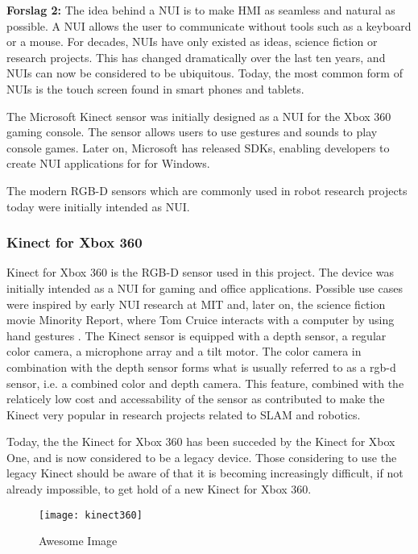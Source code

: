 \textbf{Forslag 2:}
The idea behind a \ac{NUI} is to make \ac{HMI} as seamless and natural as possible. A \ac{NUI} allows the user to communicate without tools such as a keyboard or a mouse. For decades, \ac{NUI}s have only existed as ideas, science fiction or research projects. This has changed dramatically over the last ten years, and \ac{NUI}s can now be considered to be ubiquitous. Today, the most common form of \ac{NUI}s is the touch screen found in smart phones and tablets. 

The Microsoft Kinect sensor was initially designed as a \ac{NUI} for the Xbox 360 gaming console. The sensor allows users to use gestures and sounds to play console games. Later on, Microsoft has released SDKs, enabling developers to create \ac{NUI} applications for for Windows. 

The modern RGB-D sensors which are commonly used in robot research projects today were initially intended as \ac{NUI}.

\subsubsection{Kinect for Xbox 360}

Kinect for Xbox 360 is the RGB-D sensor used in this project. The device was initially intended as a \ac{NUI} for gaming and office applications. Possible use cases were inspired by early \ac{NUI} research at \ac{MIT} and, later on, the science fiction movie Minority Report, where Tom Cruice interacts with a computer by using hand gestures \cite{kinect_book}. The Kinect sensor is equipped with a depth sensor, a regular color camera, a microphone array and a tilt motor. The color camera in combination with the depth sensor forms what is usually referred to as a rgb-d sensor, i.e. a combined color and depth camera. This feature, combined with the relaticely low cost and accessability of the sensor as contributed to make the Kinect very popular in research projects related to \ac{SLAM} and robotics.

Today, the the Kinect for Xbox 360 has been succeded by the Kinect for Xbox One, and is now considered to be a legacy device. Those considering to use the legacy Kinect should be aware of that it is becoming increasingly difficult, if not already impossible, to get hold of a new Kinect for Xbox 360. 

\begin{figure}[p]
    \centering
    \texttt{[image: kinect360]}
    \caption{Awesome Image}
    \label{fig:kinect360}
\end{figure}

